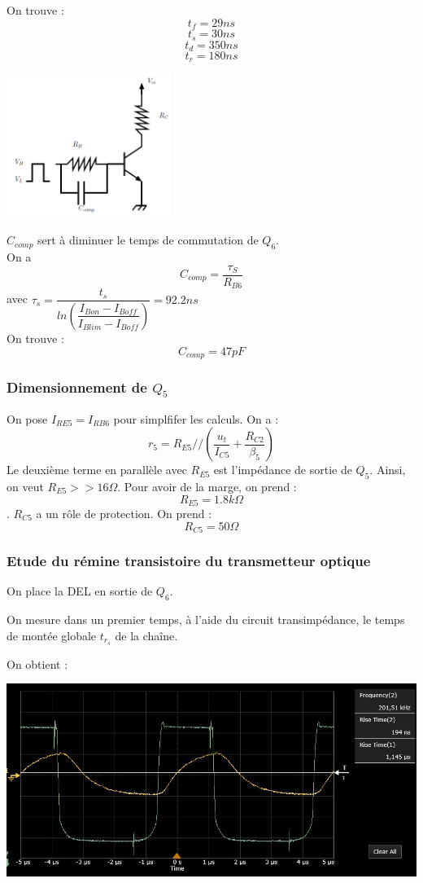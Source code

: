\documentclass[a4paper]{report}
\begin{document}
On trouve :
$$t_f = 29ns$$
$$t_s = 30ns$$
$$t_d = 350ns$$
$$t_r = 180ns$$

\begin{center}
\includegraphics[width=0.4\textwidth]{commutation_Q6.PNG}
\end{center}

$C_{comp}$ sert à diminuer le temps de commutation de $Q_6$.\\
On a $$C_{comp} = \dfrac{\tau_S}{R_{B6}}$$
avec $\tau_s = \dfrac{t_s}{ln(\dfrac{I_{Bon}-I_{Boff}}{I_{Blim}-I_{Boff}})} = 92.2ns$\\

On trouve : $$C_{comp} = 47pF$$

\subsubsection{Dimensionnement de $Q_5$}

On pose $I_{RE5} = I_{RB6}$ pour simplfifer les calculs. On a :
$$r_5 = R_{E5} // (\dfrac{u_t}{I_{C5}} + \dfrac{R_{C2}}{\beta_5})$$
Le deuxième terme en parallèle avec $R_{E5}$ est l'impédance de sortie de $Q_5$. Ainsi, on veut $R_{E5} >> 16\Omega$. Pour avoir de la marge, on prend : 
$$R_{E5} = 1.8k\Omega$$.
$R_{C5}$ a un rôle de protection. On prend :
$$R_{C5} = 50\Omega$$

\subsubsection{Etude du rémine transistoire du transmetteur optique}

On place la DEL en sortie de $Q_6$.

On mesure dans un premier temps, à l'aide du circuit transimpédance, le temps de montée globale $t_{r_{s}}$ de la chaîne.

On obtient :

\begin{center}
\includegraphics[width=1\textwidth]{trs.JPG}
\end{center}
\end{document}
